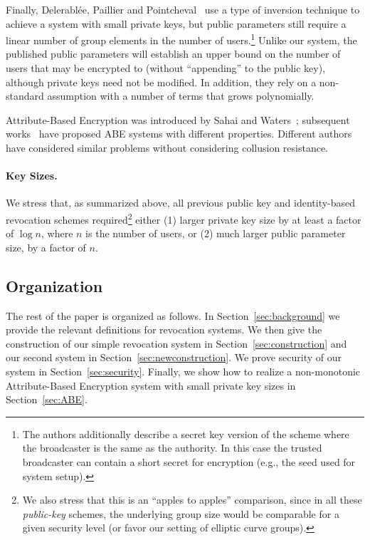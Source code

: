 \documentclass[a4paper, 11pt]{article}
\theoremstyle{definition}
\begin{document}
Finally, Delerabl{\'e}e, Paillier and Pointcheval~\cite{DPP07} use a
type of inversion technique to achieve a system with %
small private keys, but public parameters still require a linear number of group elements in the
number of users.\footnote{ The authors additionally describe a secret
key version of the scheme where the broadcaster is the same as the
authority. In this case the trusted broadcaster can contain a short
secret for encryption (e.g., the seed used for system setup).}  Unlike
our system, the published public parameters will establish an upper
bound on the number of users that may be encrypted to (without
``appending'' to the public key), although private keys need not be
modified. In addition, they rely on a non-standard assumption with a number of terms that grows polynomially. 

Attribute-Based Encryption was introduced by Sahai and
Waters~\cite{sw05}; subsequent
works~\cite{GPSW06,BSW07,chase07,OSW07,GJPS08} have proposed
ABE systems with different properties.
Different authors ~\cite{S03,MS03,BMC06,BHS04,AMS06,BF06} have considered
similar problems without considering collusion resistance.

\paragraph{Key Sizes.}  We stress that, as summarized above, all previous public key and identity-based revocation schemes required\footnote{We also stress that this is an ``apples to apples'' comparison, since in all these \emph{public-key} schemes, the underlying group size would be comparable for a given security level (or favor our setting of elliptic curve groups).} either (1) larger private key size by at least a factor of $\log n$, where $n$ is the number of users, or (2) much larger public parameter size, by a factor of $n$.

\subsection{Organization}
The rest of the paper is organized as follows. In
Section~\ref{sec:background} we provide the relevant definitions for
revocation systems. We then give the construction of
our simple revocation system in Section~\ref{sec:construction} and our second system in Section~\ref{sec:newconstruction}. We prove security of our system in Section~\ref{sec:security}.  Finally, we show how to realize
a non-monotonic Attribute-Based Encryption system with small private
key sizes in Section~\ref{sec:ABE}.
\end{document}
